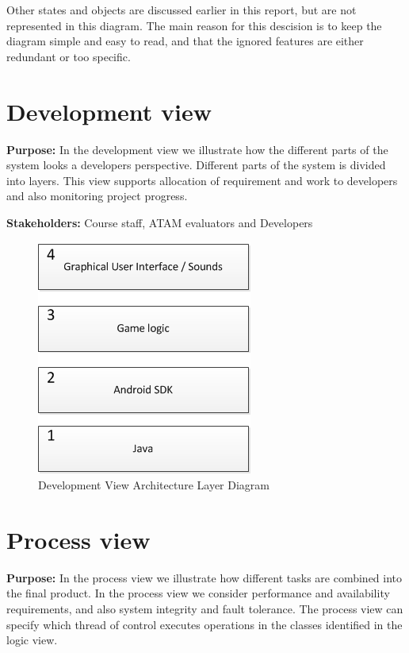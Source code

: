     Other states and objects are discussed earlier in this report, but are not represented in this diagram. The main reason for this descision is to keep the diagram simple and easy to read, and that the ignored features are either redundant or too specific.



    \section{Development view}
    \textbf{Purpose:} In the development view we illustrate how the different parts of the system looks a developers perspective. Different parts of the system is divided into layers. This view supports allocation of requirement
    and work to developers and also monitoring project progress.  
    
    \noindent\textbf{Stakeholders:} Course staff, ATAM evaluators and Developers
    

    \begin{figure}[h]
        \includegraphics{DevelopmentView.png}
        \caption{Development View Architecture Layer Diagram}
        \label{fig:DevelopmentView}
    \end{figure}
    
    
    
    \section{Process view}
    \noindent\textbf{Purpose:} In the process view we illustrate how different tasks are combined into the final product. In the process view we consider performance and availability requirements, and also system integrity and fault tolerance.
    The process view can specify which thread of control executes operations in the classes identified in the logic view. 

